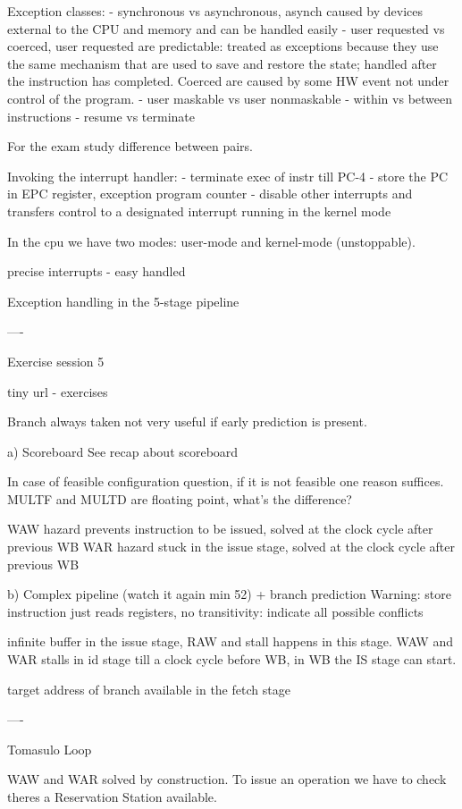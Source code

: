 Exception classes:
- synchronous vs asynchronous, asynch caused by devices external to the CPU and memory and can be handled easily
- user requested vs coerced, user requested are predictable: treated as exceptions because they use the same mechanism that are used
to save and restore the state;
handled after the instruction has completed.
Coerced are caused by some HW event not under control of the program.
- user maskable vs user nonmaskable
- within vs between instructions
- resume vs terminate

For the exam study difference between pairs.

Invoking the interrupt handler:
- terminate exec of instr till PC-4
- store the PC in EPC register, exception program counter
- disable other interrupts and transfers control to a designated interrupt running in the kernel mode

In the cpu we have two modes: user-mode and kernel-mode (unstoppable).

precise interrupts
- easy handled

Exception handling in the 5-stage pipeline


----

Exercise session 5

tiny url - exercises

Branch always taken not very useful if early prediction is present.

a) Scoreboard
See recap about scoreboard

In case of feasible configuration question, if it is not feasible one reason suffices.
MULTF and MULTD are floating point, what's the difference?

WAW hazard prevents instruction to be issued, solved at the clock cycle after previous WB
WAR hazard stuck in the issue stage, solved at the clock cycle after previous WB

b) Complex pipeline (watch it again min 52) + branch prediction
Warning: store instruction just reads registers, no transitivity: indicate all possible conflicts

infinite buffer in the issue stage, RAW and stall happens in this stage.
WAW and WAR stalls in id stage till a clock cycle before WB, in WB the IS stage can start.

target address of branch available in the fetch stage

----

Tomasulo Loop

WAW and WAR solved by construction.
To issue an operation we have to check theres a Reservation Station available.

